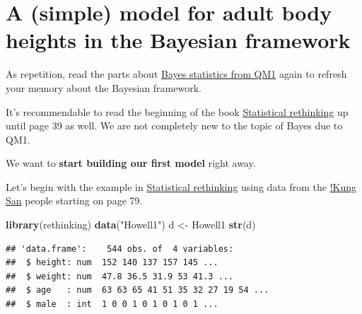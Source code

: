 \documentclass[
]{book}
\newenvironment{Shaded}{\begin{snugshade}}{\end{snugshade}}
\newcommand{\CommentTok}[1]{\textcolor[rgb]{0.56,0.35,0.01}{\textit{#1}}}
\newcommand{\DecValTok}[1]{\textcolor[rgb]{0.00,0.00,0.81}{#1}}
\newcommand{\FunctionTok}[1]{\textcolor[rgb]{0.13,0.29,0.53}{\textbf{#1}}}
\newcommand{\NormalTok}[1]{#1}
\newcommand{\OtherTok}[1]{\textcolor[rgb]{0.56,0.35,0.01}{#1}}
\newcommand{\SpecialCharTok}[1]{\textcolor[rgb]{0.81,0.36,0.00}{\textbf{#1}}}
\newcommand{\StringTok}[1]{\textcolor[rgb]{0.31,0.60,0.02}{#1}}
\begin{document}
\section{A (simple) model for adult body heights in the Bayesian framework}\label{a-simple-model-for-adult-body-heights-in-the-bayesian-framework}

As repetition, read the parts about \href{https://jdegenfellner.github.io/Script_QM1_ZHAW/bayes_statistics.html}{Bayes statistics from QM1}
again to refresh your memory about the Bayesian framework.

It's recommendable to read the beginning of the book \href{https://civil.colorado.edu/~balajir/CVEN6833/bayes-resources/RM-StatRethink-Bayes.pdf}{Statistical rethinking}
up until page 39 as well. We are not completely new to the topic of Bayes due
to QM1.

We want to \textbf{start building our first model} right away.

Let's begin with the example in
\href{https://civil.colorado.edu/~balajir/CVEN6833/bayes-resources/RM-StatRethink-Bayes.pdf}{Statistical rethinking}
using data from the \href{https://en.wikipedia.org/wiki/\%C7\%83Kung_people}{!Kung San}
people starting on page 79.

\begin{Shaded}
\begin{Highlighting}[]
\FunctionTok{library}\NormalTok{(rethinking)}
\FunctionTok{data}\NormalTok{(}\StringTok{"Howell1"}\NormalTok{)}
\NormalTok{d }\OtherTok{\textless{}{-}}\NormalTok{ Howell1}
\FunctionTok{str}\NormalTok{(d)}
\end{Highlighting}
\end{Shaded}

\begin{verbatim}
## 'data.frame':    544 obs. of  4 variables:
##  $ height: num  152 140 137 157 145 ...
##  $ weight: num  47.8 36.5 31.9 53 41.3 ...
##  $ age   : num  63 63 65 41 51 35 32 27 19 54 ...
##  $ male  : int  1 0 0 1 0 1 0 1 0 1 ...
\end{verbatim}

\begin{Shaded}
\end{Shaded}
\end{document}
